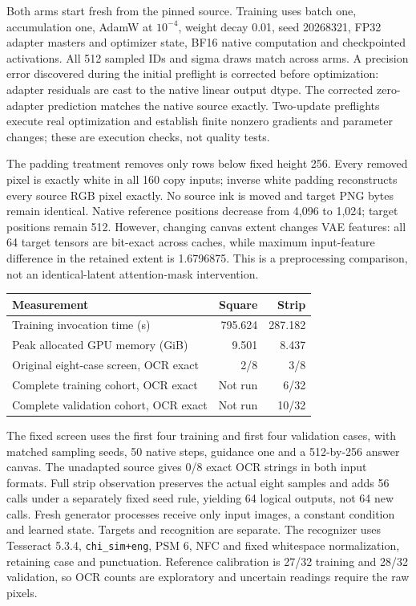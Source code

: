 \documentclass[10pt,a4paper]{article}
\begin{document}
Both arms start fresh from the pinned source. Training uses batch one,
accumulation one, AdamW at $10^{-4}$, weight decay 0.01, seed 20268321, FP32
adapter masters and optimizer state, BF16 native computation and checkpointed
activations. All 512 sampled IDs and sigma draws match across arms. A
precision error discovered during the initial preflight is corrected before
optimization: adapter residuals are cast to the native linear output dtype.
The corrected zero-adapter prediction matches the native source exactly.
Two-update preflights execute real optimization and establish finite nonzero
gradients and parameter changes; these are execution checks, not quality tests.

The padding treatment removes only rows below fixed height 256. Every removed
pixel is exactly white in all 160 copy inputs; inverse white padding
reconstructs every source RGB pixel exactly. No source ink is moved and target
PNG bytes remain identical. Native reference positions decrease from 4,096 to
1,024; target positions remain 512. However, changing canvas extent changes
VAE features: all 64 target tensors are bit-exact across caches, while maximum
input-feature difference in the retained extent is 1.6796875. This is a
preprocessing comparison, not an identical-latent attention-mask intervention.

\begin{center}\small
\begin{tabular}{lrr}
\toprule
Measurement & Square & Strip\\
\midrule
Training invocation time (s) & 795.624 & 287.182\\
Peak allocated GPU memory (GiB) & 9.501 & 8.437\\
Original eight-case screen, OCR exact & 2/8 & 3/8\\
Complete training cohort, OCR exact & Not run & 6/32\\
Complete validation cohort, OCR exact & Not run & 10/32\\
\bottomrule
\end{tabular}
\end{center}

The fixed screen uses the first four training and first four validation cases,
with matched sampling seeds, 50 native steps, guidance one and a 512-by-256
answer canvas. The unadapted source gives 0/8 exact OCR strings in both input
formats. Full strip observation preserves the actual eight samples and adds
56 calls under a separately fixed seed rule, yielding 64 logical outputs,
not 64 new calls. Fresh generator processes receive only input images, a
constant condition and learned state. Targets and recognition are separate.
The recognizer uses Tesseract 5.3.4, \texttt{chi\_sim+eng}, PSM 6, NFC and fixed
whitespace normalization, retaining case and punctuation. Reference calibration
is 27/32 training and 28/32 validation, so OCR counts are exploratory and
uncertain readings require the raw pixels.
\end{document}
